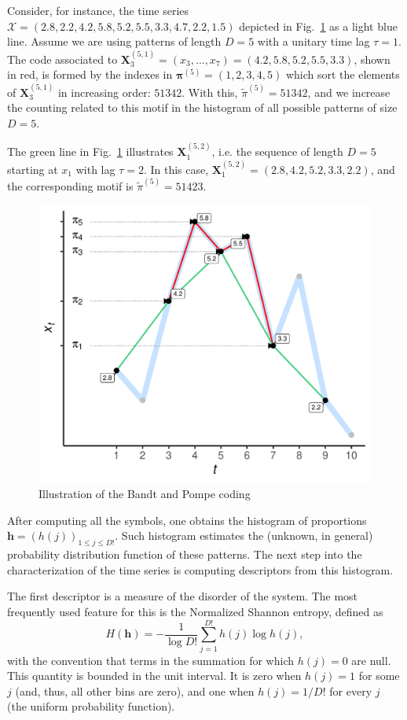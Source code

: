 \documentclass[alpha-refs]{wiley-article}
\begin{document}
Consider, for instance, the time series $\mathcal X = (2.8, 2.2, 4.2, 5.8, 5.2, 5.5, 3.3, 4.7, 2.2, 1.5)$ depicted in Fig.~\ref{Fig:IntroBP} as a light blue line.
Assume we are using patterns of length $D=5$ with a unitary time lag $\tau=1$.
The code associated to $\mathbf X_{3}^{(5,1)}=(x_3,\dots,x_7)=(4.2, 5.8, 5.2, 5.5, 3.3)$, shown in red, is formed by the indexes in $\bm\pi^{(5)}=(1,2,3,4,5)$ which sort the elements of $\mathbf X_{3}^{(5,1)}$ in increasing order: $51342$.
With this, $\widetilde{\pi}^{(5)} = 51342$, and we increase the counting related to this motif in the histogram of all possible patterns of size $D=5$.

The green line in Fig.~\ref{Fig:IntroBP} illustrates $\mathbf X_{1}^{(5,2)}$, i.e. the sequence of length $D=5$ starting at $x_1$ with lag $\tau=2$.
In this case, $\mathbf X_{1}^{(5,2)}= (2.8, 4.2, 5.2, 3.3, 2.2)$, and the corresponding motif is $\widetilde{\pi}^{(5)}=51423$.

\begin{figure}[hbt]
\centering
\includegraphics[width=.7\linewidth]{IntroBP}
\caption{Illustration of the Bandt and Pompe coding}
\label{Fig:IntroBP}
\end{figure}

After computing all the symbols, one obtains the histogram of proportions $\bm h = (h(j))_{1\leq j\leq D!}$.
Such histogram estimates the (unknown, in general) probability distribution function of these patterns.
The next step into the characterization of the time series is computing descriptors from this histogram.

The first descriptor is a measure of the disorder of the system.
The most frequently used feature for this is the Normalized Shannon entropy, defined as
\begin{equation}
H(\bm h) = -\frac{1}{\log D!} \sum_{j=1}^{D!} h(j) \log h(j),
\end{equation}
with the convention that terms in the summation for which $h(j)=0$ are null.
This quantity is bounded in the unit interval. 
It is zero when $h(j)=1$ for some $j$ (and, thus, all other bins are zero), and one when $h(j)=1/D!$ for every $j$ (the uniform probability function).
\end{document}
